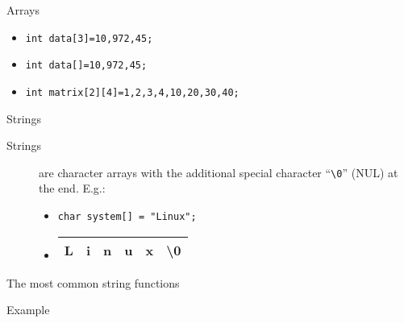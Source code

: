 \begin{frame}[fragile=singleslide]{Arrays}
  \begin{block}{}
    \begin{center}
    \end{center}
  \end{block}
\begin{itemize}
\item[\Checked] \texttt{int data[3]={10,972,45};}
\item[\Checked] \texttt{int data[]={10,972,45};}
\item[\Checked] \texttt{int matrix[2][4]={{1,2,3,4},{10,20,30,40}};}
\end{itemize}
\end{frame}

\begin{frame}[fragile=singleslide]{Strings}
  \begin{description}
  \item[Strings] are \alert{character arrays} with the additional special character ``\verb|\0|''
    (NUL) at the end. E.g.:
    \begin{itemize}
    \item[] \texttt{char system[] = "Linux";}
    \item[] \begin{tabular}{|p{1ex}|p{1ex}|p{1ex}|p{1ex}|p{1ex}|p{1ex}|} \hline
              L&i&n&u&x&\textbackslash0\\\hline
            \end{tabular}
          \end{itemize}
  \end{description}
  \begin{block}{The most common string functions}
    \begin{center}
    \end{center}
  \end{block}
\end{frame}

\begin{frame}
  \begin{block}{Example}
    \begin{center}
    \end{center}
  \end{block}
\end{frame}

